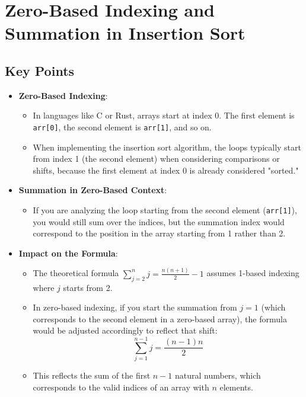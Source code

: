 \documentclass{article}
\begin{document}
\section*{Zero-Based Indexing and Summation in Insertion Sort}

\subsection*{Key Points}

\begin{itemize}
    \item \textbf{Zero-Based Indexing}:
    \begin{itemize}
        \item In languages like C or Rust, arrays start at index 0. The first element is \texttt{arr[0]}, the second element is \texttt{arr[1]}, and so on.
        \item When implementing the insertion sort algorithm, the loops typically start from index 1 (the second element) when considering comparisons or shifts, because the first element at index 0 is already considered "sorted."
    \end{itemize}
    \item \textbf{Summation in Zero-Based Context}:
    \begin{itemize}
        \item If you are analyzing the loop starting from the second element (\texttt{arr[1]}), you would still sum over the indices, but the summation index would correspond to the position in the array starting from 1 rather than 2.
    \end{itemize}
    \item \textbf{Impact on the Formula}:
    \begin{itemize}
        \item The theoretical formula \(\sum_{j=2}^{n} j = \frac{n(n+1)}{2} - 1\) assumes 1-based indexing where \(j\) starts from 2.
        \item In zero-based indexing, if you start the summation from \(j = 1\) (which corresponds to the second element in a zero-based array), the formula would be adjusted accordingly to reflect that shift:
        \[
        \sum_{j=1}^{n-1} j = \frac{(n-1)n}{2}
        \]
        \item This reflects the sum of the first \(n-1\) natural numbers, which corresponds to the valid indices of an array with \(n\) elements.
    \end{itemize}
\end{itemize}
\end{document}
